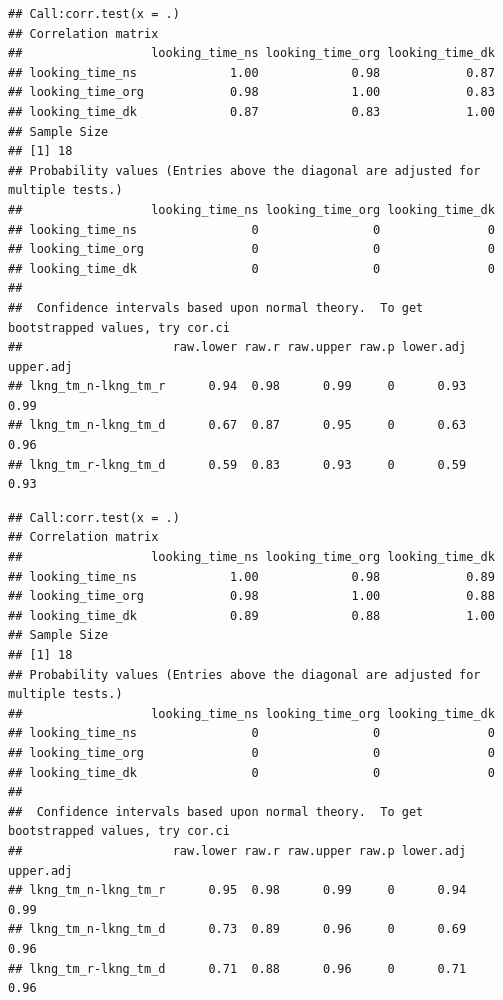 \documentclass[
]{book}
\newenvironment{Shaded}{\begin{snugshade}}{\end{snugshade}}
\newcommand{\DataTypeTok}[1]{\textcolor[rgb]{0.13,0.29,0.53}{#1}}
\newcommand{\KeywordTok}[1]{\textcolor[rgb]{0.13,0.29,0.53}{\textbf{#1}}}
\newcommand{\NormalTok}[1]{#1}
\newcommand{\OperatorTok}[1]{\textcolor[rgb]{0.81,0.36,0.00}{\textbf{#1}}}
\newcommand{\OtherTok}[1]{\textcolor[rgb]{0.56,0.35,0.01}{#1}}
\newcommand{\StringTok}[1]{\textcolor[rgb]{0.31,0.60,0.02}{#1}}
\begin{document}
\begin{verbatim}
## Call:corr.test(x = .)
## Correlation matrix 
##                  looking_time_ns looking_time_org looking_time_dk
## looking_time_ns             1.00             0.98            0.87
## looking_time_org            0.98             1.00            0.83
## looking_time_dk             0.87             0.83            1.00
## Sample Size 
## [1] 18
## Probability values (Entries above the diagonal are adjusted for multiple tests.) 
##                  looking_time_ns looking_time_org looking_time_dk
## looking_time_ns                0                0               0
## looking_time_org               0                0               0
## looking_time_dk                0                0               0
## 
##  Confidence intervals based upon normal theory.  To get bootstrapped values, try cor.ci
##                     raw.lower raw.r raw.upper raw.p lower.adj upper.adj
## lkng_tm_n-lkng_tm_r      0.94  0.98      0.99     0      0.93      0.99
## lkng_tm_n-lkng_tm_d      0.67  0.87      0.95     0      0.63      0.96
## lkng_tm_r-lkng_tm_d      0.59  0.83      0.93     0      0.59      0.93
\end{verbatim}

\begin{Shaded}
\end{Shaded}

\begin{verbatim}
## Call:corr.test(x = .)
## Correlation matrix 
##                  looking_time_ns looking_time_org looking_time_dk
## looking_time_ns             1.00             0.98            0.89
## looking_time_org            0.98             1.00            0.88
## looking_time_dk             0.89             0.88            1.00
## Sample Size 
## [1] 18
## Probability values (Entries above the diagonal are adjusted for multiple tests.) 
##                  looking_time_ns looking_time_org looking_time_dk
## looking_time_ns                0                0               0
## looking_time_org               0                0               0
## looking_time_dk                0                0               0
## 
##  Confidence intervals based upon normal theory.  To get bootstrapped values, try cor.ci
##                     raw.lower raw.r raw.upper raw.p lower.adj upper.adj
## lkng_tm_n-lkng_tm_r      0.95  0.98      0.99     0      0.94      0.99
## lkng_tm_n-lkng_tm_d      0.73  0.89      0.96     0      0.69      0.96
## lkng_tm_r-lkng_tm_d      0.71  0.88      0.96     0      0.71      0.96
\end{verbatim}
\end{document}
